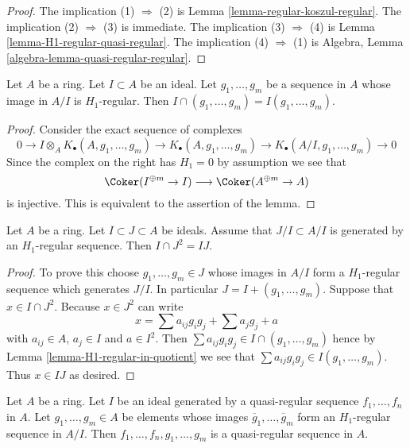 \begin{proof}
The implication (1) $\Rightarrow$ (2) is 
Lemma \ref{lemma-regular-koszul-regular}.
The implication (2) $\Rightarrow$ (3) is immediate.
The implication (3) $\Rightarrow$ (4) is 
Lemma \ref{lemma-H1-regular-quasi-regular}.
The implication (4) $\Rightarrow$ (1) is
Algebra, Lemma \ref{algebra-lemma-quasi-regular-regular}.
\end{proof}

\begin{lemma}
\label{lemma-H1-regular-in-quotient}
Let $A$ be a ring. Let $I \subset A$ be an ideal.
Let $g_1, \ldots, g_m$ be a sequence in $A$ whose image in
$A/I$ is $H_1$-regular. Then $I \cap (g_1, \ldots, g_m) =
I(g_1, \ldots, g_m)$.
\end{lemma}

\begin{proof}
Consider the exact sequence of complexes
$$
0 \to I \otimes_A K_\bullet(A, g_1, \ldots, g_m)
\to K_\bullet(A, g_1, \ldots, g_m) \to
K_\bullet(A/I, g_1, \ldots, g_m) \to 0
$$
Since the complex on the right has $H_1 = 0$ by assumption we
see that
$$
\Coker(I^{\oplus m} \to I)
\longrightarrow
\Coker(A^{\oplus m} \to A)
$$
is injective. This is equivalent to the assertion of the lemma.
\end{proof}

\begin{lemma}
\label{lemma-conormal-sequence-H1-regular}
Let $A$ be a ring. Let $I \subset J \subset A$ be ideals.
Assume that $J/I \subset A/I$ is generated by an $H_1$-regular sequence.
Then $I \cap J^2 = IJ$.
\end{lemma}

\begin{proof}
To prove this choose $g_1, \ldots, g_m \in J$
whose images in $A/I$ form a $H_1$-regular sequence which generates $J/I$.
In particular $J = I + (g_1, \ldots, g_m)$.
Suppose that $x \in I \cap J^2$. Because $x \in J^2$ can write
$$
x =
\sum a_{ij} g_ig_j +
\sum a_j g_j +
a
$$
with $a_{ij} \in A$, $a_j \in I$ and $a \in I^2$.
Then $\sum a_{ij}g_ig_j \in I \cap (g_1, \ldots, g_m)$
hence by
Lemma \ref{lemma-H1-regular-in-quotient}
we see that $\sum a_{ij}g_ig_j \in I(g_1, \ldots, g_m)$.
Thus $x \in IJ$ as desired.
\end{proof}

\begin{lemma}
\label{lemma-join-quasi-regular-H1-regular}
Let $A$ be a ring. Let $I$ be an ideal generated by a quasi-regular
sequence $f_1, \ldots, f_n$ in $A$. Let $g_1, \ldots, g_m \in A$ be
elements whose images $\overline{g}_1, \ldots, \overline{g}_m$ form an
$H_1$-regular sequence in $A/I$. Then $f_1, \ldots, f_n, g_1, \ldots, g_m$
is a quasi-regular sequence in $A$.
\end{lemma}

